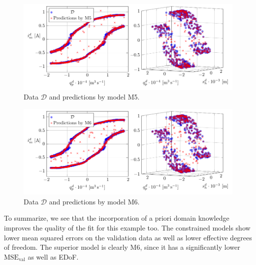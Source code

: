 \begin{figure}[H]
	\centering 
	\includegraphics{graphics/pgfplots/cha5/Bosch/M5.pdf}
	\caption{Data $\mathcal{D}$ and predictions by model M5.}
	\label{fig:bosch-M5}
\end{figure}

\begin{figure}[H]
	\centering 
	\includegraphics{graphics/pgfplots/cha5/Bosch/M6.pdf}
	\caption{Data $\mathcal{D}$ and predictions by model M6.}
	\label{fig:bosch-M6}
\end{figure}

To summarize, we see that the incorporation of a priori domain knowledge improves the quality of the fit for this example too. The constrained models show lower mean squared errors on the validation data as well as lower effective degrees of freedom. The superior model is clearly M6, since it has a significantly lower $\text{MSE}_{\text{val}}$ as well as EDoF. 